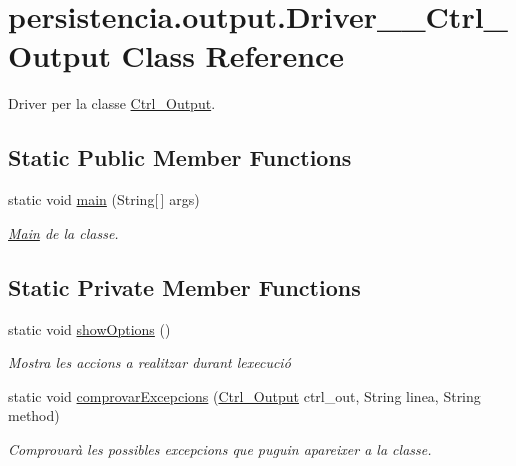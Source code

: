 \hypertarget{classpersistencia_1_1output_1_1Driver____Ctrl__Output}{}\section{persistencia.\+output.\+Driver\+\_\+\+\_\+\+Ctrl\+\_\+\+Output Class Reference}
\label{classpersistencia_1_1output_1_1Driver____Ctrl__Output}


Driver per la classe \hyperlink{classpersistencia_1_1output_1_1Ctrl__Output}{Ctrl\+\_\+\+Output}.  


\subsection*{Static Public Member Functions}
\begin{DoxyCompactItemize}
\item 
static void \hyperlink{classpersistencia_1_1output_1_1Driver____Ctrl__Output_ab5a20df1417ca8ac83a4c754c284599c}{main} (String\mbox{[}$\,$\mbox{]} args)
\begin{DoxyCompactList}\small\item\em \hyperlink{classMain}{Main} de la classe. \end{DoxyCompactList}\end{DoxyCompactItemize}
\subsection*{Static Private Member Functions}
\begin{DoxyCompactItemize}
\item 
\mbox{\label{classpersistencia_1_1output_1_1Driver____Ctrl__Output_aceadcc132060c8491487c7d20a382c5b}} 
static void \hyperlink{classpersistencia_1_1output_1_1Driver____Ctrl__Output_aceadcc132060c8491487c7d20a382c5b}{show\+Options} ()
\begin{DoxyCompactList}\small\item\em Mostra les accions a realitzar durant l\textquotesingle{}execució \end{DoxyCompactList}\item 
static void \hyperlink{classpersistencia_1_1output_1_1Driver____Ctrl__Output_a19885299457cf4049efde8b78a0f7627}{comprovar\+Excepcions} (\hyperlink{classpersistencia_1_1output_1_1Ctrl__Output}{Ctrl\+\_\+\+Output} ctrl\+\_\+out, String linea, String method)
\begin{DoxyCompactList}\small\item\em Comprovarà les possibles excepcions que puguin apareixer a la classe. \end{DoxyCompactList}\end{DoxyCompactItemize}


